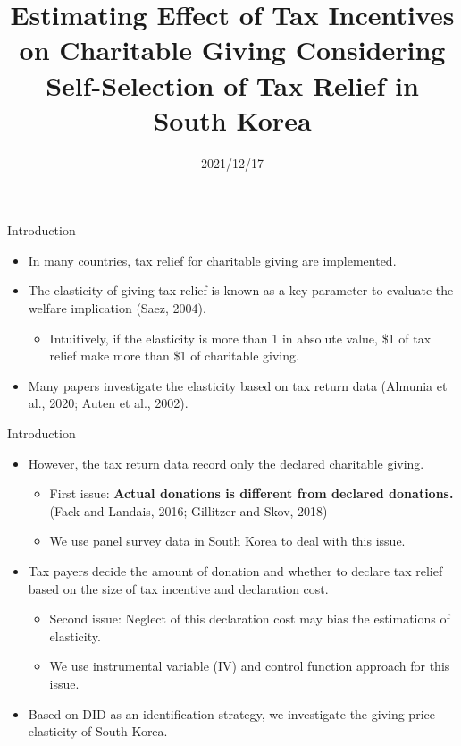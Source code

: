\documentclass[
  ignorenonframetext,
  aspectratio=169,
]{beamer}
\title{Estimating Effect of Tax Incentives on Charitable Giving Considering Self-Selection of Tax Relief in South Korea  }
\author[shortname]{ Hiroki Kato \inst{1} \and  Tsuyoshi Goto \inst{2} \and  Yong-Rok Kim \inst{3} \and }
\institute[shortinst]{ \inst{1} Osaka University \and  \inst{2} Chiba University \and  \inst{3} Kansai University \and }
\date{2021/12/17}
\providecommand{\tightlist}{%
  \setlength{\itemsep}{0pt}\setlength{\parskip}{0pt}}
\begin{document}
\frame{\titlepage}

\begin{frame}{Introduction}
\protect\hypertarget{introduction}{}
\begin{itemize}
\tightlist
\item
  In many countries, tax relief for charitable giving are implemented.
\item
  The elasticity of giving tax relief is known as a key parameter to evaluate the welfare implication (Saez, 2004).

  \begin{itemize}
  \tightlist
  \item
    Intuitively, if the elasticity is more than 1 in absolute value, \$1 of tax relief make more than \$1 of charitable giving.
  \end{itemize}
\item
  Many papers investigate the elasticity based on tax return data (Almunia et al., 2020; Auten et al., 2002).
\end{itemize}
\end{frame}

\begin{frame}{Introduction}
\protect\hypertarget{introduction-1}{}
\begin{itemize}
\tightlist
\item
  However, the tax return data record only the declared charitable giving.

  \begin{itemize}
  \tightlist
  \item
    First issue: \textbf{Actual donations is different from declared donations.} (Fack and Landais, 2016; Gillitzer and Skov, 2018)
  \item
    We use panel survey data in South Korea to deal with this issue.
  \end{itemize}
\item
  Tax payers decide the amount of donation and whether to declare tax relief based on the size of tax incentive and declaration cost.

  \begin{itemize}
  \tightlist
  \item
    Second issue: Neglect of this declaration cost may bias the estimations of elasticity.
  \item
    We use instrumental variable (IV) and control function approach for this issue.
  \end{itemize}
\item
  Based on DID as an identification strategy, we investigate the giving price elasticity of South Korea.
\end{itemize}
\end{frame}
\end{document}
